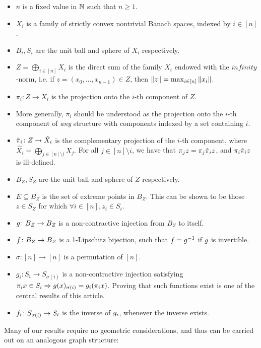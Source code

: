 \documentclass{amsart}
\theoremstyle{definition}
\begin{document}
\begin{itemize}
    \item $n$ is a fixed value in $\mathbb{N}$ such that $n \geq 1$.
    \item $X_i$ is a family of strictly convex nontrivial Banach spaces, indexed by $i \in [n]$.
    \item $B_i, S_i$ are the unit ball and sphere of $X_i$ respectively.
    \item $Z = \bigoplus_{i \in [n]} X_i$ is the direct sum of the family $X_i$ endowed with the $infinity$-norm, i.e. if $z = (x_0, \ldots, x_{n-1}) \in Z$, then $\norm{z} = \max_{i \in [n]} \norm{x_i}$.
    \item $\pi_i \colon Z \to X_i$ is the projection onto the $i$-th component of $Z$.
    \item More generally, $\pi_i$ should be understood as the projection onto the $i$-th component of \textit{any} structure with components indexed by a set containing $i$.
    \item $\hat{\pi}_i \colon Z \to \hat{X}_i$ is the complementary projection of the $i$-th component, where $\hat{X}_i = \bigoplus_{j \in [n] \setminus {i} }X_j$. For all $j \in [n] \setminus i$, we have that $\pi_j z = \pi_j \hat{\pi}_i z$, and $\pi_i \hat{\pi}_i z$ is ill-defined.
    \item $B_Z, S_Z$ are the unit ball and sphere of $Z$ respectively.
    \item $E \subseteq B_Z$ is the set of extreme points in $B_Z$. This can be shown to be those $z \in S_Z$ for which $\forall i \in [n], z_i \in S_i$.
    \item $g \colon B_Z \to B_Z$ is a non-contractive injection from $B_Z$ to itself.
    \item $f \colon B_Z \to B_Z$ is a 1-Lipschitz bijection, such that $f = g^{-1}$ if $g$ is invertible.
    \item $\sigma \colon [n] \to [n]$ is a permutation of $[n]$.
    \item $g_i \colon S_i \to S_{\sigma(i)}$ is a non-contractive injection satisfying $\pi_i x \in S_i \Rightarrow g(x)_{\sigma(i)} = g_i (\pi_i x)$. Proving that such functions exist is one of the central results of this article.
    \item $f_i \colon S_{\sigma(i)} \to S_i$ is the inverse of $g_i$, whenever the inverse exists.
\end{itemize}

Many of our results require no geometric considerations, and thus can be carried out on an analogous graph structure:
\end{document}
